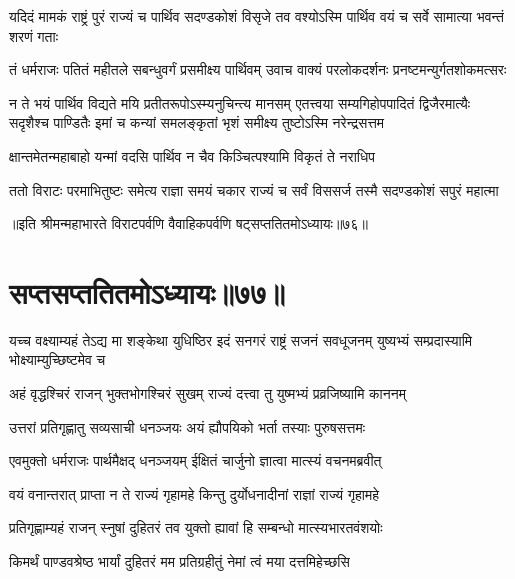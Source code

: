 \threelineshloka
{यदिदं मामकं राष्ट्रं पुरं राज्यं च पार्थिव}
{सदण्डकोशं विसृजे तव वश्योऽस्मि पार्थिव}
{वयं च सर्वे सामात्या भवन्तं शरणं गताः}



\fourlineindentedshloka
{तं धर्मराजः पतितं महीतले}
{सबन्धुवर्गं प्रसमीक्ष्य पार्थिवम्}
{उवाच वाक्यं परलोकदर्शनः}
{प्रनष्टमन्युर्गतशोकमत्सरः}


\sixlineindentedshloka
{न ते भयं पार्थिव विद्यते मयि}
{प्रतीतरूपोऽस्म्यनुचिन्त्य मानसम्}
{एतत्त्वया सम्यगिहोपपादितं}
{द्विजैरमात्यैः सदृशैश्च पाण्डितैः}
{इमां च कन्यां समलङ्कृतां भृशं}
{समीक्ष्य तुष्टोऽस्मि नरेन्द्रसत्तम}


\twolineshloka
{क्षान्तमेतन्महाबाहो यन्मां वदसि पार्थिव}
{न चैव किञ्चित्पश्यामि विकृतं ते नराधिप}



\fourlineindentedshloka
{ततो विराटः परमाभितुष्टः}
{समेत्य राज्ञा समयं चकार}
{राज्यं च सर्वं विससर्ज तस्मै}
{सदण्डकोशं सपुरं महात्मा}

॥इति श्रीमन्महाभारते विराटपर्वणि वैवाहिकपर्वणि षट्सप्ततितमोऽध्यायः॥७६॥

\chapter{सप्तसप्ततितमोऽध्यायः॥७७॥}

\threelineshloka
{यच्च वक्ष्याम्यहं तेऽद्य मा शङ्केथा युधिष्ठिर}
{इदं सनगरं राष्ट्रं सजनं सवधूजनम्}
{युष्यभ्यं सम्प्रदास्यामि भोक्ष्याम्युच्छिष्टमेव च}


\twolineshloka
{अहं वृद्धश्चिरं राजन् भुक्तभोगश्चिरं सुखम्}
{राज्यं दत्त्वा तु युष्मभ्यं प्रव्रजिष्यामि काननम्}


\twolineshloka
{उत्तरां प्रतिगृह्णातु सव्यसाची धनञ्जयः}
{अयं ह्यौपयिको भर्ता तस्याः पुरुषसत्तमः}



\twolineshloka
{एवमुक्तो धर्मराजः पार्थमैक्षद् धनञ्जयम्}
{ईक्षितं चार्जुनो ज्ञात्वा मात्स्यं वचनमब्रवीत्}


\twolineshloka
{वयं वनान्तरात् प्राप्ता न ते राज्यं गृहामहे}
{किन्तु दुर्योधनादीनां राज्ञां राज्यं गृहामहे}


\twolineshloka
{प्रतिगृह्णाम्यहं राजन् स्नुषां दुहितरं तव}
{युक्तो ह्यावां हि सम्बन्धो मात्स्यभारतवंशयोः}




\twolineshloka
{किमर्थं पाण्डवश्रेष्ठ भार्यां दुहितरं मम}
{प्रतिग्रहीतुं नेमां त्वं मया दत्तमिहेच्छसि}

